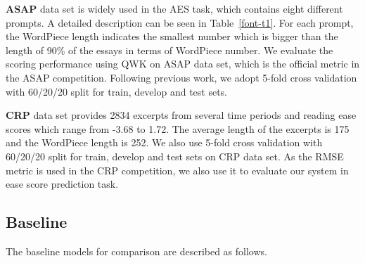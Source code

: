 \documentclass[11pt]{article}
\begin{document}
\textbf{ASAP} data set is widely used in the AES task, which contains eight different prompts.
A detailed description can be seen in Table~\ref{font-t1}. For each prompt, the WordPiece length indicates the smallest number which is bigger than the length of 90\% of the essays in terms of WordPiece number.
We evaluate the scoring performance using QWK on ASAP data set, which is the official metric in the ASAP competition. Following previous work, we adopt 5-fold cross validation with 60/20/20 split for train, develop and test sets.
\begin{table}[b!]
\begin{center}
\end{center}
\caption{\label{font-t1} Statistics of ASAP data set. }
\end{table}

\textbf{CRP} data set provides 2834 excerpts from several time periods and reading ease scores which range from -3.68 to 1.72. The average length of the excerpts is 175 and the WordPiece length is 252. We also use 5-fold cross validation with 60/20/20 split for train, develop and test sets on CRP data set. As the RMSE metric is used in the CRP competition, we also use it to evaluate our system in ease score prediction task.






\subsection{Baseline}
The baseline models for comparison are described as follows.
\end{document}
